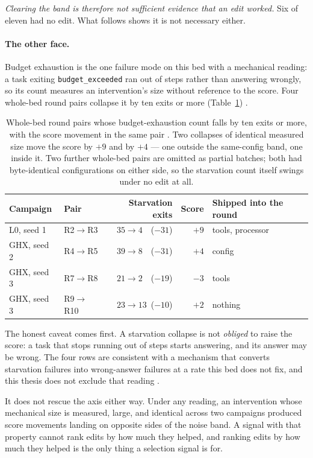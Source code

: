 \emph{Clearing the band is therefore not sufficient evidence that an edit
worked.} Six of eleven had no edit. What follows shows it is not necessary
either.

\paragraph{The other face.} Budget exhaustion is the one failure mode on
this bed with a mechanical reading: a task exiting \texttt{budget\_exceeded}
ran out of steps rather than answering wrongly, so its count measures an
intervention's size without reference to the score. Four whole-bed round
pairs collapse it by ten exits or more (Table~\ref{tab:starvation})
.

\begin{table}[htbp]
\centering\small
\begin{tabular}{llrrl}
\toprule
Campaign & Pair & Starvation exits & Score & Shipped into the round \\
\midrule
L0, seed 1  & R2$\to$R3  & $35 \to 4$\ \ ($-31$)  & $+9$ & tools, processor \\
GHX, seed 2 & R4$\to$R5  & $39 \to 8$\ \ ($-31$)  & $+4$ & config \\
GHX, seed 3 & R7$\to$R8  & $21 \to 2$\ \ ($-19$)  & $-3$ & tools \\
GHX, seed 3 & R9$\to$R10 & $23 \to 13$\ ($-10$)   & $+2$ & nothing \\
\bottomrule
\end{tabular}
\caption[Starvation collapses and what the score did with them]{Whole-bed
round pairs whose budget-exhaustion count falls by ten exits or more, with
the score movement in the same pair . Two collapses of identical
measured size move the score by $+9$ and by $+4$ --- one outside the
same-config band, one inside it. Two further whole-bed pairs are omitted as
partial batches; both had byte-identical configurations on either side, so
the starvation count itself swings under no edit at all.}
\label{tab:starvation}
\end{table}

The honest caveat comes first. A starvation collapse is not \emph{obliged}
to raise the score: a task that stops running out of steps starts
answering, and its answer may be wrong. The four rows are consistent with a
mechanism that converts starvation failures into wrong-answer failures at a
rate this bed does not fix, and this thesis does not exclude that reading
.

It does not rescue the axis either way. Under any reading, an intervention
whose mechanical size is measured, large, and identical across two
campaigns produced score movements landing on opposite sides of the noise
band. A signal with that property cannot rank edits by how much they
helped, and ranking edits by how much they helped is the only thing a
selection signal is for.

